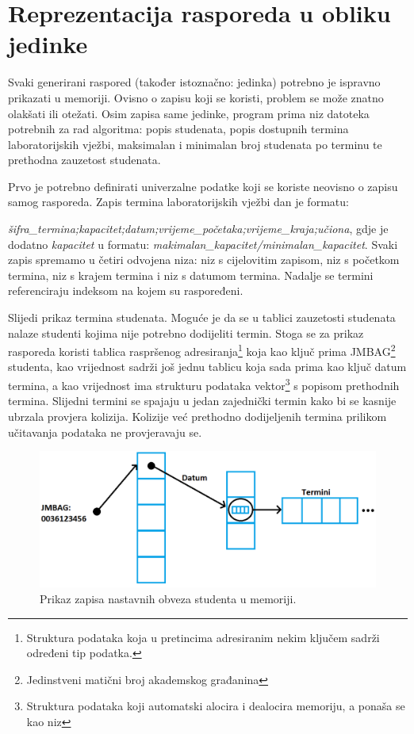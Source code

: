 \documentclass[times, utf8, zavrsni]{fer}
\begin{document}
\section{Reprezentacija rasporeda u obliku jedinke}

Svaki generirani raspored (također istoznačno: jedinka) potrebno je ispravno prikazati u memoriji. Ovisno o zapisu koji se koristi, problem se može znatno olakšati ili otežati. Osim zapisa same jedinke, program prima niz datoteka potrebnih za rad algoritma: popis studenata, popis dostupnih termina laboratorijskih vježbi, maksimalan i minimalan broj studenata po terminu te prethodna zauzetost studenata.

Prvo je potrebno definirati univerzalne podatke koji se koriste neovisno o zapisu samog rasporeda. Zapis termina laboratorijskih vježbi dan je formatu:

\emph{šifra\_termina;kapacitet;datum;vrijeme\_početaka;vrijeme\_kraja;učiona}, gdje je dodatno \emph{kapacitet} u formatu: \emph{makimalan\_kapacitet/minimalan\_kapacitet}. Svaki zapis spremamo u četiri odvojena niza: niz s cijelovitim zapisom, niz s početkom termina, niz s krajem termina i niz s datumom termina. Nadalje se termini referenciraju indeksom na kojem su raspoređeni.

Slijedi prikaz termina studenata. Moguće je da se u tablici zauzetosti studenata nalaze studenti kojima nije potrebno dodijeliti termin. Stoga se za prikaz rasporeda koristi tablica raspršenog adresiranja\footnote{Struktura podataka koja u pretincima adresiranim nekim ključem sadrži određeni tip podatka.} koja kao ključ prima JMBAG\footnote{Jedinstveni matični broj akademskog građanina} studenta, kao vrijednost sadrži još jednu tablicu koja sada prima kao ključ datum termina, a kao vrijednost ima strukturu podataka vektor\footnote{Struktura podataka koji automatski alocira i dealocira memoriju, a ponaša se kao niz} s popisom prethodnih termina. Slijedni termini se spajaju u jedan zajednički termin kako bi se kasnije ubrzala provjera kolizija. Kolizije već prethodno dodijeljenih termina prilikom učitavanja podataka ne provjeravaju se.

\begin{figure}[htb]
\centering
\includegraphics[width=15cm]{images/prikaz_termina.png}
\caption{Prikaz zapisa nastavnih obveza studenta u memoriji.}
\label{fig:prikaz_termina}
\end{figure}
\end{document}
